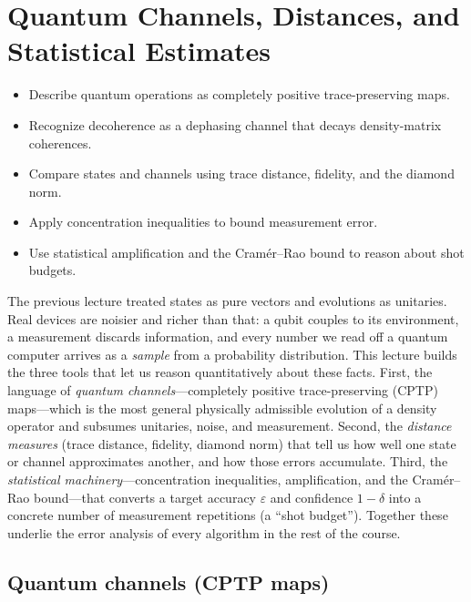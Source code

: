 \chapter{Quantum Channels, Distances, and Statistical Estimates}
\label{ch:lec02}

\begin{objectives}
\begin{itemize}[leftmargin=1.4em,nosep]
  \item Describe quantum operations as completely positive trace-preserving maps.
  \item Recognize decoherence as a dephasing channel that decays density-matrix coherences.
  \item Compare states and channels using trace distance, fidelity, and the diamond norm.
  \item Apply concentration inequalities to bound measurement error.
  \item Use statistical amplification and the Cram\'er--Rao bound to reason about shot budgets.
\end{itemize}
\end{objectives}

The previous lecture treated states as pure vectors and evolutions as unitaries.
Real devices are noisier and richer than that: a qubit couples to its
environment, a measurement discards information, and every number we read off a
quantum computer arrives as a \emph{sample} from a probability distribution.
This lecture builds the three tools that let us reason quantitatively about these
facts. First, the language of \emph{quantum channels}---completely positive
trace-preserving (CPTP) maps---which is the most general physically admissible
evolution of a density operator and subsumes unitaries, noise, and measurement.
Second, the \emph{distance measures} (trace distance, fidelity, diamond norm)
that tell us how well one state or channel approximates another, and how those
errors accumulate. Third, the \emph{statistical machinery}---concentration
inequalities, amplification, and the Cram\'er--Rao bound---that converts a target
accuracy $\varepsilon$ and confidence $1-\delta$ into a concrete number of
measurement repetitions (a ``shot budget''). Together these underlie the error
analysis of every algorithm in the rest of the course.

\section{Quantum channels (CPTP maps)}
\label{sec:lec02-1}

